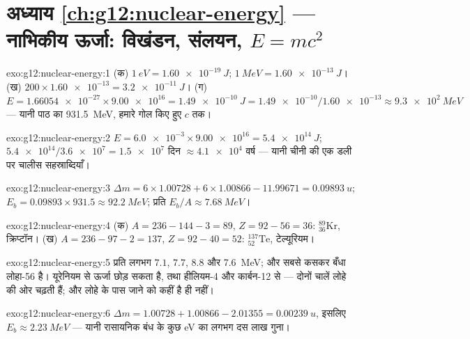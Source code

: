 \section*{अध्याय \ref{ch:g12:nuclear-energy} --- नाभिकीय ऊर्जा: विखंडन, संलयन, $E=mc^2$}

\begin{solution}{exo:g12:nuclear-energy:1}
(क) $\qty{1}{eV} = \qty{1.60e-19}{J}$; $\qty{1}{MeV} = \qty{1.60e-13}{J}$।
(ख) $200 \times \num{1.60e-13} = \qty{3.2e-11}{J}$।
(ग) $E = \num{1.66054e-27} \times \num{9.00e16} = \qty{1.49e-10}{J}
= \num{1.49e-10}/\num{1.60e-13} \approx \qty{9.3e2}{MeV}$ --- यानी पाठ का \qty{931.5}{MeV}, हमारे गोल किए हुए $c$ तक।
\end{solution}

\begin{solution}{exo:g12:nuclear-energy:2}
$E = \num{6.0e-3} \times \num{9.00e16} = \qty{5.4e14}{J}$; $\num{5.4e14}/\num{3.6e7} = \num{1.5e7}$ दिन $\approx \num{4.1e4}$ वर्ष --- यानी चीनी की एक डली पर चालीस सहस्राब्दियाँ।
\end{solution}

\begin{solution}{exo:g12:nuclear-energy:3}
$\Delta m = 6 \times 1.00728 + 6 \times 1.00866 - 11.99671 =
\qty{0.09893}{u}$; $E_b = 0.09893 \times 931.5 \approx \qty{92.2}{MeV}$; प्रति  $E_b/A \approx \qty{7.68}{MeV}$।
\end{solution}

\begin{solution}{exo:g12:nuclear-energy:4}
(क) $A = 236 - 144 - 3 = 89$, $Z = 92 - 56 = 36$: ${}^{89}_{36}\mathrm{Kr}$, क्रिप्टॉन।
(ख) $A = 236 - 97 - 2 = 137$, $Z = 92 - 40 = 52$: ${}^{137}_{52}\mathrm{Te}$, टेल्यूरियम।
\end{solution}

\begin{solution}{exo:g12:nuclear-energy:5}
प्रति  लगभग $7.1$, $7.7$, $8.8$ और \qty{7.6}{MeV}; और सबसे कसकर
बँधा लोहा-56 है। यूरेनियम  से ऊर्जा छोड़ सकता है, तथा
हीलियम-4 और कार्बन-12  से --- दोनों चालें लोहे की ओर चढ़ती हैं;
और लोहे के पास जाने को कहीं है ही नहीं।
\end{solution}

\begin{solution}{exo:g12:nuclear-energy:6}
$\Delta m = 1.00728 + 1.00866 - 2.01355 = \qty{0.00239}{u}$, इसलिए $E_b \approx \qty{2.23}{MeV}$ --- यानी रासायनिक बंध के कुछ \unit{eV} का लगभग दस लाख गुना।
\end{solution}

